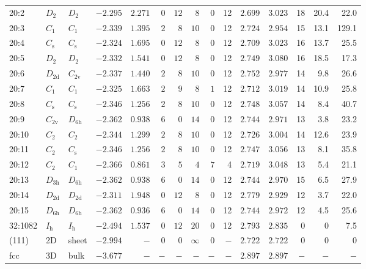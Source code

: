 \begin{table}[htbp]
{\begin{tabular}{lllrrrrrrrrrrrr}
20:2    & $D_\mathrm{2}$  & $D_\mathrm{2 }$ & $-2.295$ & $2.271$  & $0$ & $12$ & $8$      & $0$ & 12  & $2.699$ & $3.023$ & 18  & 20.4 & 22.0  \\
20:3    & $C_\mathrm{1}$  & $C_\mathrm{1 }$ & $-2.339$ & $1.395$  & $2$ & $8$  & $10$     & $0$ & 12  & $2.724$ & $2.954$ & 15  & 13.1 & 129.1 \\
20:4    & $C_\mathrm{s}$  & $C_\mathrm{s }$ & $-2.324$ & $1.695$  & $0$ & $12$ & $8$      & $0$ & 12  & $2.709$ & $3.023$ & 16  & 13.7 & 25.5  \\
20:5    & $D_\mathrm{2}$  & $D_\mathrm{2 }$ & $-2.332$ & $1.541$  & $0$ & $12$ & $8$      & $0$ & 12  & $2.749$ & $3.080$ & 16  & 18.5 & 17.3  \\
20:6    & $D_\mathrm{2d}$ & $C_\mathrm{2v}$ & $-2.337$ & $1.440$  & $2$ & $8$  & $10$     & $0$ & 12  & $2.752$ & $2.977$ & 14  & 9.8  & 26.6  \\
20:7    & $C_\mathrm{1}$  & $C_\mathrm{1 }$ & $-2.325$ & $1.663$  & $2$ & $9$  & $8$      & $1$ & 12  & $2.712$ & $3.019$ & 14  & 10.9 & 25.8  \\
20:8    & $C_\mathrm{s}$  & $C_\mathrm{s }$ & $-2.346$ & $1.256$  & $2$ & $8$  & $10$     & $0$ & 12  & $2.748$ & $3.057$ & 14  & 8.4  & 40.7  \\
20:9    & $C_\mathrm{2v}$ & $D_\mathrm{6h}$ & $-2.362$ & $0.938$  & $6$ & $0$  & $14$     & $0$ & 12  & $2.744$ & $2.971$ & 13  & 3.8  & 23.2  \\
20:10   & $C_\mathrm{2}$  & $C_\mathrm{2 }$ & $-2.344$ & $1.299$  & $2$ & $8$  & $10$     & $0$ & 12  & $2.726$ & $3.004$ & 14  & 12.6 & 23.9  \\
20:11   & $C_\mathrm{2}$  & $C_\mathrm{s }$ & $-2.346$ & $1.256$  & $2$ & $8$  & $10$     & $0$ & 12  & $2.747$ & $3.056$ & 13  & 8.1  & 35.8  \\
20:12   & $C_\mathrm{2}$  & $C_\mathrm{1}$    & $-2.366$ & $0.861$  & $3$ & $5$  & $4$      & $7$ & 4   & $2.719$ & $3.048$ & 13  & 5.4  & 21.1  \\
20:13   & $D_\mathrm{3h}$ & $D_\mathrm{6h}$ & $-2.362$ & $0.938$  & $6$ & $0$  & $14$     & $0$ & 12  & $2.744$ & $2.970$ & 15  & 6.5  & 27.9  \\
20:14   & $D_\mathrm{2d}$ & $D_\mathrm{2d}$ & $-2.311$ & $1.948$  & $0$ & $12$ & $8$      & $0$ & 12  & $2.779$ & $2.929$ & 12  & 3.7  & 22.0  \\
20:15   & $D_\mathrm{6h}$ & $D_\mathrm{6h}$ & $-2.362$ & $0.936$  & $6$ & $0$  & $14$     & $0$ & 12  & $2.744$ & $2.972$ & 12  & 4.5  & 25.6  \\
32:1082 & $I_\mathrm{h}$  & $I_\mathrm{h}$    & $-2.494$ & $1.537$  & $0$ & $12$ & $20$     & $0$ & 12  & $2.793$ & $2.835$ & 0   & 0    & 7.5   \\
(111)   & 2D              & sheet    & $-2.994$ & $-$      & $0$ & $0$  & $\infty$ & $0$ & $-$ & $2.722$ & $2.722$ & 0   & 0    & 0     \\
fcc     & 3D              & bulk     & $-3.677$ & $-$      & $-$ & $-$  & $-$      & $-$ & $-$ & $2.897$ & $2.897$ & $-$ & $-$  & $-$   \\
		\bottomrule
    \end{tabular}}
\end{table}


